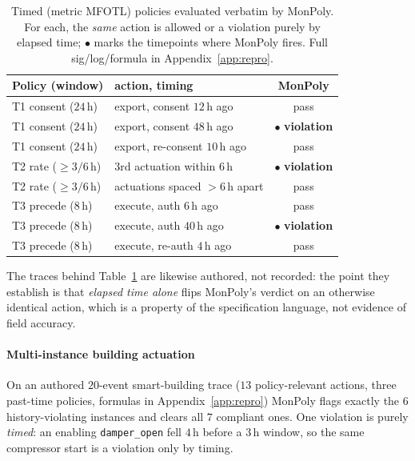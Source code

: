 \documentclass[sigconf]{acmart}
\begin{document}
\begin{table}[t]
\centering
\caption{Timed (metric MFOTL) policies evaluated verbatim by MonPoly. For each, the
\emph{same} action is allowed or a violation purely by elapsed time; $\bullet$ marks
the timepoints where MonPoly fires. Full sig/log/formula in Appendix~\ref{app:repro}.}
\label{tab:timed}
\renewcommand{\arraystretch}{1.1}
\setlength{\tabcolsep}{5pt}
\footnotesize
\begin{tabular}{llc}
\toprule
Policy (window) & action, timing & MonPoly \\
\midrule
T1 consent ($24$\,h)   & export, consent $12$\,h ago      & pass \\
T1 consent ($24$\,h)   & export, consent $48$\,h ago      & $\bullet$ \textbf{violation} \\
T1 consent ($24$\,h)   & export, re-consent $10$\,h ago   & pass \\
T2 rate ($\ge3/6$\,h)  & 3rd actuation within $6$\,h      & $\bullet$ \textbf{violation} \\
T2 rate ($\ge3/6$\,h)  & actuations spaced $>6$\,h apart  & pass \\
T3 precede ($8$\,h)    & execute, auth $6$\,h ago         & pass \\
T3 precede ($8$\,h)    & execute, auth $40$\,h ago        & $\bullet$ \textbf{violation} \\
T3 precede ($8$\,h)    & execute, re-auth $4$\,h ago      & pass \\
\bottomrule
\end{tabular}
\end{table}

The traces behind Table~\ref{tab:timed} are likewise authored, not recorded: the point
they establish is that \emph{elapsed time alone} flips MonPoly's verdict on an
otherwise identical action, which is a property of the specification language, not
evidence of field accuracy.

\paragraph{Multi-instance building actuation} On an authored $20$-event smart-building
trace ($13$ policy-relevant actions, three past-time policies, formulas in
Appendix~\ref{app:repro}) MonPoly flags exactly the $6$ history-violating instances and
clears all $7$ compliant ones. One violation is purely \emph{timed}: an enabling
\texttt{damper\_open} fell $4$\,h before a $3$\,h window, so the same compressor start is
a violation only by timing.
\end{document}
